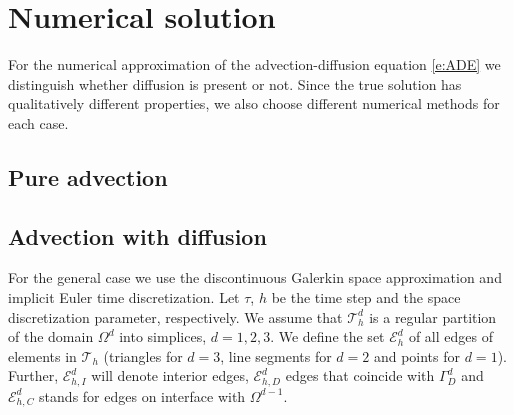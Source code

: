 \documentclass[a4paper]{article}
\def\Eh{\mathcal E_h}       %
\def\Ehcom{\mathcal E_{h,C}}         %
\def\Ehdir{\mathcal E_{h,D}}         %
\def\Ehint{\mathcal E_{h,I}}       %
\def\Th{\mathcal T_h}       %
\begin{document}
\section{Numerical solution}

For the numerical approximation of the advection-diffusion equation \eqref{e:ADE} we distinguish whether diffusion is present or not.
Since the true solution has qualitatively different properties, we also choose different numerical methods for each case.

\subsection{Pure advection}

\subsection{Advection with diffusion}

For the general case we use the discontinuous Galerkin space approximation and implicit Euler time discretization.
Let $\tau$, $h$ be the time step and the space discretization parameter, respectively.
We assume that $\Th^d$ is a regular partition of the domain $\Omega^d$ into simplices, $d=1,2,3$.
We define the set $\Eh^d$ of all edges of elements in $\Th$ (triangles for $d=3$, line segments for $d=2$ and points for $d=1$).
Further, $\Ehint^d$ will denote interior edges, $\Ehdir^d$ edges that coincide with $\Gamma_D^d$ and $\Ehcom^d$ stands for edges on interface with $\Omega^{d-1}$.
\end{document}
